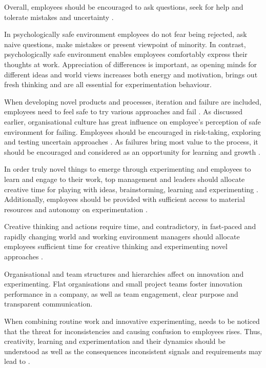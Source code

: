 Overall, employees should be encouraged to ask questions, seek for help and tolerate mistakes and uncertainty \citep{edmondson1999psychological}.

In psychologically safe environment employees do not fear being rejected, ask naive questions, make mistakes or present viewpoint of minority. In contrast, psychologically safe environment enables employees comfortably express their thoughts at work. Appreciation of differences is important, as opening minds for different ideas and world views increases both energy and motivation, brings out fresh thinking and are all essential for experimentation behaviour. \citep{garvin2008yours} 

When developing novel products and processes, iteration and failure are included, employees need to feel safe to try various approaches and fail \citep{shalley2004leaders}. As discussed earlier, organisational culture has great influence on employee's perception of safe environment for failing. Employees should be encouraged in risk-taking, exploring and testing uncertain approaches \citep{garvin2008yours}. As failures bring most value to the process, it should be encouraged \citep{thomke2001enlightened} and considered as an opportunity for learning and growth \citep{farson2002failuretolerantleader}. 

In order truly novel things to emerge through experimenting and employees to learn and engage to their work, top management and leaders should allocate creative time for playing with ideas, brainstorming, learning and experimenting \citep{amabile2002creativity}. Additionally, employees should be provided with sufficient access to material resources \citep{katz1985project} and autonomy on experimentation \citep{shalley2004leaders}. 

Creative thinking and actions require time, and contradictory, in fast-paced and rapidly changing world and working environment managers should allocate employees sufficient time for creative thinking and experimenting novel approaches \citep{shalley2004leaders}.

Organisational and team structures and hierarchies affect on innovation and experimenting. Flat organisations and small project teams foster innovation performance in a company, as well as team engagement, clear purpose and transparent communication. \citep{shalley2004leaders}

When combining routine work and innovative experimenting, needs to be noticed that the threat for inconsistencies and causing confusion to employees rises. Thus, creativity, learning and experimentation and their dynamics should be understood as well as the consequences inconsistent signals and requirements may lead to \citep{lee2004mixed}.

